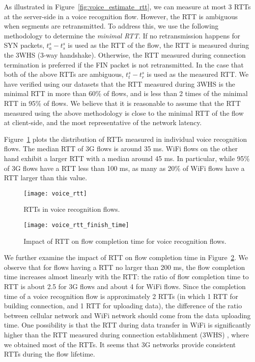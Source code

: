 As illustrated in Figure~\ref{fig:voice_estimate_rtt}, we can measure at most 3 RTTs at the server-side in a voice recognition flow. However, the RTT is ambiguous when segments are retransmitted. To address this, we use the following methodology to determine the \emph{minimal RTT}. If no retransmission happens for SYN packets, $t^s_a - t^s_s$ is used as the RTT of the flow, \ie the RTT is measured during the 3WHS (3-way handshake). Otherwise, the RTT measured during connection termination is preferred if the FIN packet is not retransmitted. In the case that both of the above RTTs are ambiguous, $t^s_t - t^s_r$ is used as the measured RTT. We have verified using our datasets that the RTT measured during 3WHS is the minimal RTT in more than 60\% of flows, and is less than 2 times of the minimal RTT in 95\% of flows. We believe that it is reasonable to assume that the RTT measured using the above methodology is close to the minimal RTT of the flow at client-side, and the most representative of the network latency.

Figure~\ref{fig:voice_rtt} plots the distribution of RTTs measured in individual voice recognition flows. The median RTT of 3G flows is around 35 ms. WiFi flows on the other hand exhibit a larger RTT with a median around 45 ms. In particular, while 95\% of 3G flows have a RTT less than 100 ms, as many as 20\% of WiFi flows have a RTT larger than this value.

\begin{figure}[t]
\centering
	\texttt{[image: voice\_rtt]}
\caption{RTTs in voice recognition flows.}
\label{fig:voice_rtt}
\minsqueeze
\end{figure}

\begin{figure}[th]
\centering
	\texttt{[image: voice\_rtt\_finish\_time]}
\caption{Impact of RTT on flow completion time for voice recognition flows.}
\label{fig:v_rtt_time}
\minsqueeze
\end{figure}

We further examine the impact of RTT on flow completion time in Figure~\ref{fig:v_rtt_time}. We observe that for flows having a RTT no larger than 200 ms, the flow completion time increases almost linearly with the RTT: the ratio of flow completion time to RTT is about 2.5 for 3G flows and about 4 for WiFi flows. Since the completion time of a voice recognition flow is approximately 2 RTTs (in which 1 RTT for building connection, and 1 RTT for uploading data), the difference of the ratio between cellular network and WiFi network should come from the data uploading time. One possibility is that the RTT during data transfer in WiFi is significantly higher than the RTT measured during connection establishment (\ie 3WHS) \cite{UM-CS-2012-022}, where we obtained most of the RTTs. It seems that 3G networks provide consistent RTTs during the flow lifetime.

